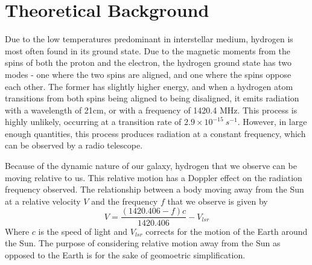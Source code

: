 \section{Theoretical Background}
Due to the low temperatures predominant in interstellar medium, hydrogen is most often found in its ground state. Due to the magnetic moments from the spins of both the proton and the electron, the hydrogen ground state has two modes - one where the two spins are aligned, and one where the spins oppose each other. The former has slightly higher energy, and when a hydrogen atom transitions from both spins being aligned to being disaligned, it emits radiation with a wavelength of 21cm, or with a frequency of 1420.4 MHz. This process is highly unlikely, occurring at a transition rate of $2.9 \times 10^{-15}\ s^{-1}$. However, in large enough quantities, this process produces radiation at a constant frequency, which can be observed by a radio telescope. 

Because of the dynamic nature of our galaxy, hydrogen that we observe can be moving relative to us. This relative motion has a Doppler effect on the radiation frequency observed. The relationship between a body moving away from the Sun at a relative velocity $V$ and the frequency $f$ that we observe is given by
\begin{equation}
  V = \frac{(1420.406 - f)c}{1420.406} - V_{lsr}
\end{equation}
Where $c$ is the speed of light and $V_{lsr}$ corrects for the motion of the Earth around the Sun. The purpose of considering relative motion away from the Sun as opposed to the Earth is for the sake of geomoetric simplification.

